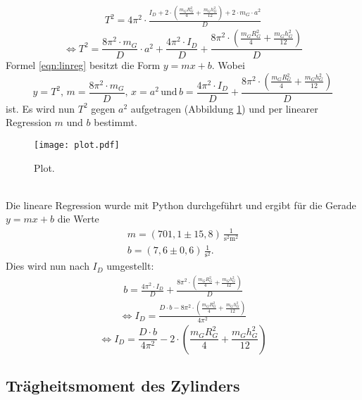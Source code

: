\begin{align*}
  T^2 = 4\pi^2 \cdot \frac{I_D + 2 \cdot \left(\frac{m_G R_G^2}{4} + \frac{m_G h_G^2}{12} \right) + 2 \cdot m_G \cdot a^2}{D}
\end{align*}
\begin{equation}
  \label{eqn:linreg}
  \Leftrightarrow T^2 = \frac{8\pi^2 \cdot m_G}{D}\cdot a^2 + \frac{4\pi^2 \cdot I_D}{D}  + \frac{8\pi^2 \cdot \left(\frac{m_G R_G^2}{4} + \frac{m_G h_G^2}{12} \right)}{D}
\end{equation}
Formel \ref{eqn:linreg} besitzt die Form $y = mx + b$. Wobei 
\begin{equation*}
  y = T^2,\, m = \frac{8\pi^2 \cdot m_G}{D},\, x = a^2 \, \mathrm{und}\, b = \frac{4\pi^2 \cdot I_D}{D}  + \frac{8\pi^2 \cdot \left(\frac{m_G R_G^2}{4} + \frac{m_G h_G^2}{12} \right)}{D}
\end{equation*}
ist. Es wird nun $T^2$ gegen $a^2$ aufgetragen (Abbildung \ref{fig:plot}) und per linearer Regression $m$ und $b$ bestimmt.
 \begin{figure}
   \centering
   \texttt{[image: plot.pdf]}
   \caption{Plot.}
   \label{fig:plot}
 \end{figure}
\\
Die lineare Regression wurde mit Python durchgeführt und ergibt für die Gerade $y = mx + b$ die Werte
\begin{align*}
  m = (701{,}1 \pm 15{,}8)\, \frac{1}{\mathrm{s^2 m^2}} \\
  b = (7{,}6 \pm 0{,}6)\, \frac{1}{\mathrm{s^2}} .
\end{align*}
Dies wird nun nach $I_D$ umgestellt:
\begin{align*}
  b = \frac{4\pi^2 \cdot I_D}{D}  + \frac{8\pi^2 \cdot \left(\frac{m_G R_G^2}{4} + \frac{m_G h_G^2}{12} \right)}{D}
\end{align*}
\begin{align*}
  \Leftrightarrow I_D = \frac{D \cdot b - 8\pi^2 \cdot \left(\frac{m_G R_G^2}{4} + \frac{m_G h_G^2}{12} \right)}{4\pi^2}
\end{align*}
\begin{equation}
  \Leftrightarrow I_D = \frac{D \cdot b}{4\pi^2} - 2 \cdot \left(\frac{m_G R_G^2}{4} + \frac{m_G h_G^2}{12} \right)
\end{equation}

\subsection{Trägheitsmoment des Zylinders}
\label{sec:TraegheitsmomentdesZylinders}
